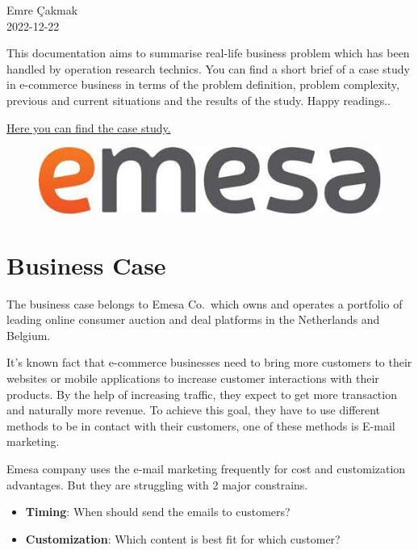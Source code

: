 \documentclass[
  letterpaper,
  DIV=11,
  numbers=noendperiod]{scrreprt}
\begin{document}
Emre Çakmak\\
2022-12-22

\hfill\break

This documentation aims to summarise real-life business problem which
has been handled by operation research technics. You can find a short
brief of a case study in e-commerce business in terms of the problem
definition, problem complexity, previous and current situations and the
results of the study. Happy readings..

\href{https://www.gurobi.com/wp-content/uploads/2022/08/CaseStudy-2021Jun-Emesa_Eng.pdf?x58432}{Here
you can find the case study.}

\begin{figure}

{\centering \includegraphics{./images/emesa.png}

}

\end{figure}

\hypertarget{business-case}{%
\section{Business Case}\label{business-case}}

The business case belongs to Emesa Co.~which owns and operates a
portfolio of leading online consumer auction and deal platforms in the
Netherlands and Belgium.

It's known fact that e-commerce businesses need to bring more customers
to their websites or mobile applications to increase customer
interactions with their products. By the help of increasing traffic,
they expect to get more transaction and naturally more revenue. To
achieve this goal, they have to use different methods to be in contact
with their customers, one of these methods is E-mail marketing.

Emesa company uses the e-mail marketing frequently for cost and
customization advantages. But they are struggling with 2 major
constrains.

\begin{itemize}
\item
  \textbf{Timing}: When should send the emails to customers?
\item
  \textbf{Customization}: Which content is best fit for which customer?
\end{itemize}
\end{document}
